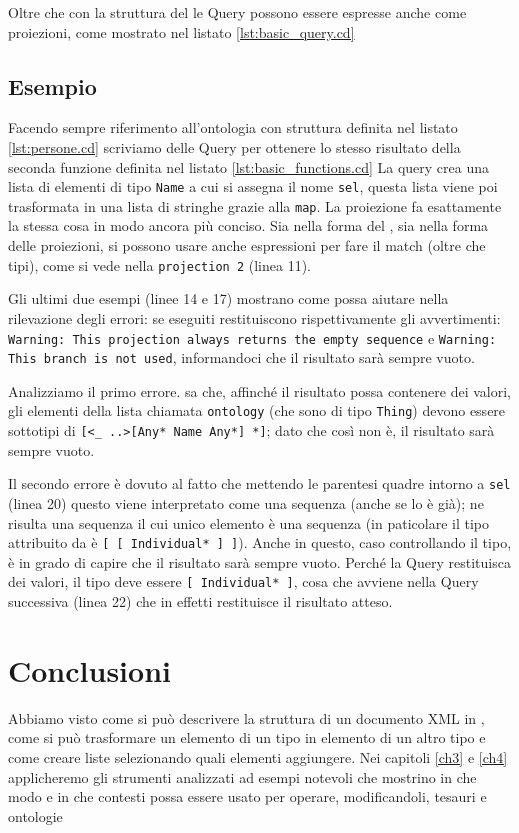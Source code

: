 Oltre che con la struttura del  le Query possono essere espresse anche come proiezioni, come mostrato nel listato \ref{lst:basic_query.cd}

\subsection{Esempio}
Facendo sempre riferimento all'ontologia con struttura definita nel listato \ref{lst:persone.cd} scriviamo delle Query per ottenere lo stesso risultato della seconda funzione definita nel listato \ref{lst:basic_functions.cd}
La query crea una lista di elementi di tipo \verb|Name| a cui si assegna il nome \verb|sel|, questa lista viene poi trasformata in una lista di stringhe grazie alla \verb|map|. La proiezione fa esattamente la stessa cosa in modo ancora più conciso. Sia nella forma del , sia nella forma delle proiezioni, si possono usare anche espressioni per fare il match (oltre che tipi), come si vede nella \verb|projection 2| (linea 11).

Gli ultimi due esempi (linee 14 e 17) mostrano come \cduce possa aiutare nella rilevazione degli errori: se eseguiti restituiscono rispettivamente gli avvertimenti: \texttt{Warning: This projection always returns the empty sequence} e \texttt{Warning: This branch is not used}, informandoci che il risultato sarà sempre vuoto.

Analizziamo il primo errore. \cduce sa che, affinché il risultato possa contenere dei valori, gli elementi della lista chiamata \verb|ontology| (che sono di tipo \verb|Thing|) devono essere sottotipi di \verb|[<_ ..>[Any* Name Any*] *]|; dato che così non è, il risultato sarà sempre vuoto.

Il secondo errore è dovuto al fatto che mettendo le parentesi quadre intorno a \verb|sel| (linea 20) questo viene interpretato come una sequenza (anche se lo è già); ne risulta una sequenza il cui unico elemento è una sequenza (in paticolare il tipo attribuito da \cduce è \verb|[ [ Individual* ] ]|). Anche in questo, caso controllando il tipo, \cduce è in grado di capire che il risultato sarà sempre vuoto. Perché la Query restituisca dei valori, il tipo deve essere \verb|[ Individual* ]|, cosa che avviene nella Query successiva (linea 22) che in effetti restituisce il risultato atteso.

\section{Conclusioni}
Abbiamo visto come si può descrivere la struttura di un documento XML in \cduce, come si può trasformare un elemento di un tipo in elemento di un altro tipo e come creare liste selezionando quali elementi aggiungere. Nei capitoli \ref{ch3} e \ref{ch4} applicheremo gli strumenti analizzati ad esempi notevoli che mostrino in che modo e in che contesti \cduce possa essere usato per operare, modificandoli, tesauri e ontologie